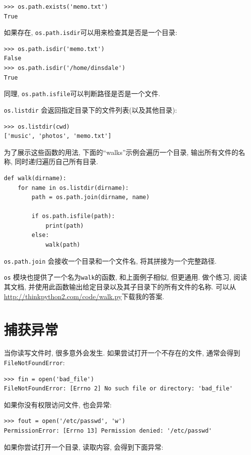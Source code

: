 \documentclass[10pt]{book}
\begin{document}
\begin{verbatim}
>>> os.path.exists('memo.txt')
True
\end{verbatim}
%
如果存在, {\tt os.path.isdir}可以用来检查其是否是一个目录:

\begin{verbatim}
>>> os.path.isdir('memo.txt')
False
>>> os.path.isdir('/home/dinsdale')
True
\end{verbatim}
%
同理, {\tt os.path.isfile}可以判断路径是否是一个文件. 

{\tt os.listdir} 会返回指定目录下的文件列表(以及其他目录):

\begin{verbatim}
>>> os.listdir(cwd)
['music', 'photos', 'memo.txt']
\end{verbatim}
%
为了展示这些函数的用法, 下面的``walks''示例会遍历一个目录, 
输出所有文件的名称, 同时递归遍历自己所有目录. 

\begin{verbatim}
def walk(dirname):
    for name in os.listdir(dirname):
        path = os.path.join(dirname, name)

        if os.path.isfile(path):
            print(path)
        else:
            walk(path)
\end{verbatim}
%

{\tt os.path.join} 会接收一个目录和一个文件名, 将其拼接为一个完整路径. 

{\tt os} 模块也提供了一个名为{\tt walk}的函数, 和上面例子相似, 但更通用. 
做个练习, 阅读其文档, 并使用此函数输出给定目录以及其子目录下的所有文件的名称. 
可以从\url{http://thinkpython2.com/code/walk.py}下载我的答案. 


\section{捕获异常}
\label{catch}

当你读写文件时, 很多意外会发生. 
如果尝试打开一个不存在的文件, 通常会得到{\tt FileNotFoundError}:

\begin{verbatim}
>>> fin = open('bad_file')
FileNotFoundError: [Errno 2] No such file or directory: 'bad_file'

\end{verbatim}
%
如果你没有权限访问文件, 也会异常:

\begin{verbatim}
>>> fout = open('/etc/passwd', 'w')
PermissionError: [Errno 13] Permission denied: '/etc/passwd'
\end{verbatim}
%
如果你尝试打开一个目录, 读取内容, 会得到下面异常:
\end{document}
